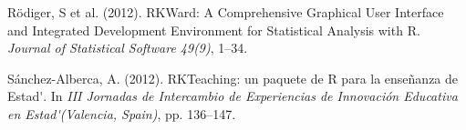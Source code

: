 \documentclass[11pt, a4paper]{article}
\begin{document}
\begin{hangparas}{.25in}{1}

R\"odiger, S et al. (2012). 
RKWard: A Comprehensive Graphical User Interface and Integrated Development Environment for Statistical Analysis with R. 
\textit{Journal of Statistical Software 49(9)}, 1--34.

S\'anchez-Alberca, A. (2012).
RKTeaching: un paquete de R para la enseñanza de Estad\'\istica. 
In \textit{III Jornadas de Intercambio de Experiencias de Innovación Educativa en Estad\'\istica (Valencia, Spain)}, pp. 136--147.

\end{hangparas}
\end{document}
